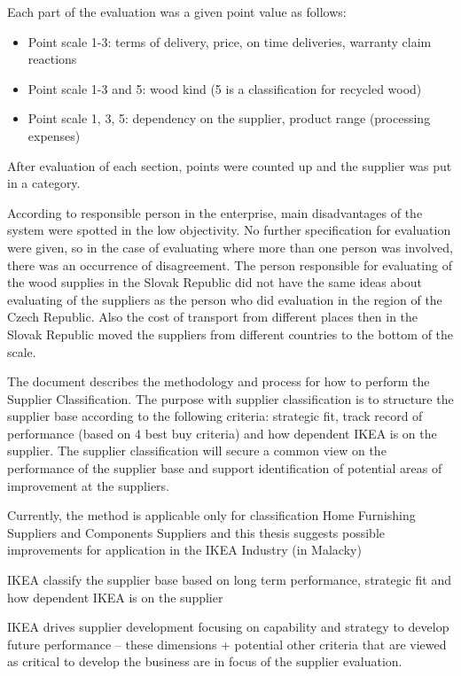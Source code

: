 \documentclass[oneside,12pt]{article}%
\begin{document}

Each part of the evaluation was a given point value as follows:

\begin{itemize}
  \item Point scale 1-3: terms of delivery, price, on time deliveries, warranty claim reactions
  \item Point scale 1-3 and 5: wood kind (5 is a classification for recycled wood)
  \item Point scale 1, 3, 5:  dependency on the supplier, product range (processing expenses)
\end{itemize}

After evaluation of each section, points were counted up and the supplier was put in a category.

According to responsible person in the enterprise, main disadvantages of the system were spotted in the low objectivity. No further specification for evaluation were given, so in the case of evaluating where more than one person was involved, there was an occurrence of disagreement. The person responsible for evaluating of the wood supplies in the Slovak Republic did not have the same ideas about evaluating of the suppliers as the person who did evaluation in the region of the Czech Republic. Also the cost of transport from different places then in the Slovak Republic moved the suppliers from different countries to the bottom of the scale.

The document describes the methodology and process for how to perform the Supplier Classification. The purpose with supplier classification is to structure the supplier base according to the following criteria: strategic fit, track record of performance (based on 4 best buy criteria) and how dependent IKEA is on the supplier. The supplier classification will secure a common view on the performance of the supplier base and support identification of potential areas of improvement at the suppliers. \par
Currently, the method is applicable only for classification Home Furnishing Suppliers and Components Suppliers and this thesis suggests possible improvements for application in the IKEA Industry (in Malacky)\par
IKEA classify the supplier base based on long term performance, strategic fit and how dependent IKEA is on the supplier \par
IKEA drives supplier development focusing on capability and strategy to develop future performance – these dimensions + potential other criteria that are viewed as critical to develop the business are in focus of the supplier evaluation.
\end{document}
